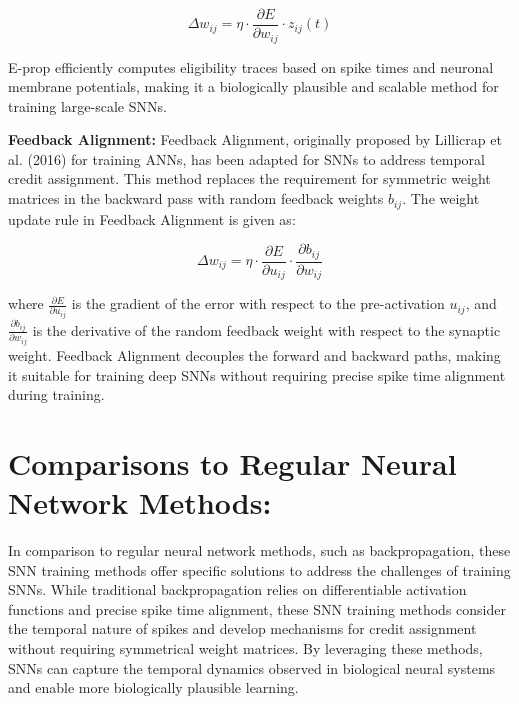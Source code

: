 \[
\Delta w_{ij} = \eta \cdot \frac{\partial E}{\partial w_{ij}} \cdot z_{ij}(t)
\]

E-prop efficiently computes eligibility traces based on spike times and neuronal membrane potentials, making it a biologically plausible and scalable method for training large-scale SNNs.

\textbf{Feedback Alignment:}
Feedback Alignment, originally proposed by Lillicrap et al. (2016) for training ANNs, has been adapted for SNNs to address temporal credit assignment. This method replaces the requirement for symmetric weight matrices in the backward pass with random feedback weights $b_{ij}$. The weight update rule in Feedback Alignment is given as:

\[
\Delta w_{ij} = \eta \cdot \frac{\partial E}{\partial u_{ij}} \cdot \frac{\partial b_{ij}}{\partial w_{ij}}
\]

where $\frac{\partial E}{\partial u_{ij}}$ is the gradient of the error with respect to the pre-activation $u_{ij}$, and $\frac{\partial b_{ij}}{\partial w_{ij}}$ is the derivative of the random feedback weight with respect to the synaptic weight. Feedback Alignment decouples the forward and backward paths, making it suitable for training deep SNNs without requiring precise spike time alignment during training.

\section*{Comparisons to Regular Neural Network Methods:}
In comparison to regular neural network methods, such as backpropagation, these SNN training methods offer specific solutions to address the challenges of training SNNs. While traditional backpropagation relies on differentiable activation functions and precise spike time alignment, these SNN training methods consider the temporal nature of spikes and develop mechanisms for credit assignment without requiring symmetrical weight matrices. By leveraging these methods, SNNs can capture the temporal dynamics observed in biological neural systems and enable more biologically plausible learning.
